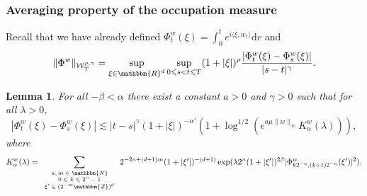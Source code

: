 \documentclass[a4paper,11pt]{article}
\newcommand{\mathd}{\mathrm{d}}
\newcommand{\tmscript}[1]{\text{\scriptsize{$#1$}}}
\newtheorem{lemma}[theorem]{Lemma}
\begin{document}
\subsubsection{Averaging property of the occupation measure}



Recall that we have already defined $\Phi^{w}_{t} ( \xi ) = \int_{0}^{t} e^{i
\langle \xi ,w_{r} \rangle} \mathd r$ and
\[ \| \Phi^{w} \|_{\mathcal{W}^{\rho , \gamma}_{T}} = \sup_{\xi \in
   \mathbbm{R}^{d}}   \sup_{0 \leqslant s<t \leqslant T} ( 1+ | \xi | )^{\rho}
   \frac{| \Phi^{w}_{t} ( \xi )- \Phi^{w}_{s} ( \xi ) |}{|s-t|^{\gamma}} . \]


\begin{lemma}
  \label{lemma:chaining-Y}For all $- \beta < \alpha$ there exist a constant
  $a>0$ and $\gamma >0$ such that for all $\lambda >0$,
  \[ | \Phi^{w}_{t} ( \xi )- \Phi^{w}_{s} ( \xi ) | \lesssim | t-s |^{\gamma}
     ( 1+ | \xi | )^{- \alpha'} ( 1+ \log^{1/2} ( e^{a \mu \| w \|_{\infty}}
     K^{w}_{\alpha} ( \lambda ) ) ), \]
  where
  \[ K^{w}_{\alpha} ( \lambda ) = \sum_{\tmscript{\begin{array}{c}
       n,m \in \mathbbm{N}\\
       0 \leqslant k \leqslant 2^{n} -1\\
       \xi' \in ( 2^{-m} \mathbbm{Z} )^{d}
     \end{array}}} 2^{-2n+ ( d+1 ) m} ( 1+ | \xi' | )^{- ( d+1 )} \exp (
     \lambda 2^{n} ( 1+ | \xi' | )^{2 \beta} | \Phi^{w}_{k2^{-n} , ( k+1 )
     2^{-n}} ( \xi' ) |^{2} ) . \]
\end{lemma}
\end{document}
